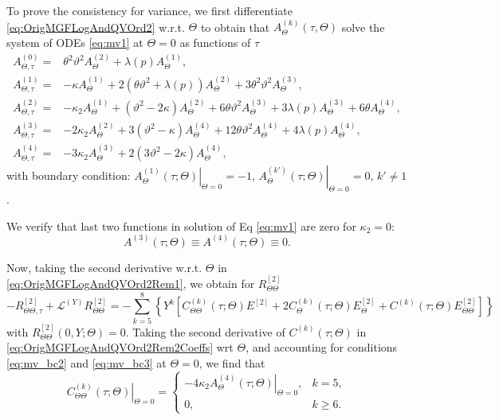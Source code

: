\documentclass[pdftex,11pt,a4paper] {article}
\begin{document}
To prove the consistency for variance, we first differentiate \eqref{eq:OrigMGFLogAndQVOrd2} w.r.t. $\Theta$ to obtain that $A^{(k)}_{\Theta}(\tau,\Theta)$ solve the system of ODEs \eqref{eq:mv1}  at $\Theta=0$ as functions of $\tau$
\begin{equation}\label{eq:mv1}
\begin{split}
A^{(0)}_{\Theta, \tau}=&\theta^2\vartheta^2A_{\Theta}^{(2)}+\lambda(p) A_{\Theta}^{(1)},\\
A^{(1)}_{\Theta, \tau}=&-\kappa A_{\Theta}^{(1)} +2(\theta\vartheta^2+\lambda(p)) A_{\Theta}^{(2)}+3\theta^2\vartheta^2 A_{\Theta}^{(3)},\\
A^{(2)}_{\Theta, \tau}=&-\kappa_2A_{\Theta}^{(1)}+(\vartheta^2-2\kappa)A_{\Theta}^{(2)}+6\theta\vartheta^2 A_{\Theta}^{(3)}+3\lambda(p) A_{\Theta}^{(3)}+6\theta A_{\Theta}^{(4)},\\
A^{(3)}_{\Theta, \tau}=&-2\kappa_2A_{\Theta}^{(2)}+3(\vartheta^2-\kappa)A_{\Theta}^{(4)}+12\theta\vartheta^2 A_{\Theta}^{(4)}+4\lambda(p) A_{\Theta}^{(4)},\\
A^{(4)}_{\Theta, \tau}=&-3\kappa_2A_{\Theta}^{(3)}+2(3\vartheta^2-2\kappa)A_{\Theta}^{(4)},
\end{split}
\end{equation}
with boundary condition: $\left.A^{(1)}_{\Theta}(\tau; \Theta)\right|_{\Theta=0}=-1$, $\left.A^{(k')}_{\Theta}(\tau; \Theta)\right|_{\Theta=0}=0$, $k'\neq 1$.

We verify that last two functions in solution of Eq \eqref{eq:mv1} are zero for $\kappa_{2}=0$:
\begin{equation}\label{eq:mv_bc3}
A^{(3)}(\tau; \Theta)\equiv A^{(4)}(\tau; \Theta)\equiv 0.
\end{equation}

Now, taking the second derivative w.r.t. $\Theta$ in \eqref{eq:OrigMGFLogAndQVOrd2Rem1}, we obtain for $R_{\Theta\Theta}^{[2]}$
\begin{equation*}%
-R_{\Theta\Theta,\tau}^{[2]}+\mathcal{L}^{(Y)}R_{\Theta\Theta}^{[2]}=
-\sum_{k=5}^8\left\{Y^k\left[C_{\Theta\Theta}^{(k)}(\tau;\Theta)E^{[2]} + 2C_{\Theta}^{(k)}(\tau;\Theta)E_{\Theta}^{[2]} + C^{(k)}(\tau;\Theta)E_{\Theta\Theta}^{[2]}\right]\right\}
\end{equation*}
with $R_{\Theta\Theta}^{[2]}(0,Y;\Theta)=0$. Taking the second derivative of $C^{(k)}(\tau;\Theta)$ in \eqref{eq:OrigMGFLogAndQVOrd2Rem2Coeffs} wrt $\Theta$, and accounting for conditions \eqref{eq:mv_bc2} and \eqref{eq:mv_bc3} at $\Theta=0$, we find that
\begin{equation}\label{eq:mv51}
\left.C^{(k)}_{\Theta\Theta}(\tau; \Theta)\right|_{\Theta=0}=
\begin{cases}
-4\kappa_2 \left. A^{(4)}_{\Theta}(\tau; \Theta)\right|_{\Theta=0}, & k=5,\\
0, & k\ge 6.
\end{cases}
\end{equation}
\end{document}
